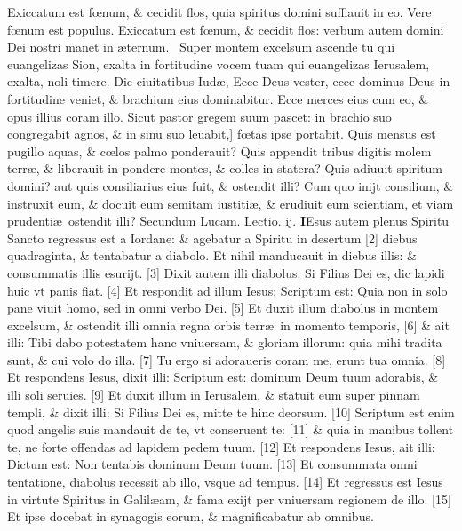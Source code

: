 \documentclass[a5paper,10pt]{book}
\def\ae{æ}
\def\oe{œ}
\begin{document}
\begin{multicols*}{2}
Exiccatum est f\oe num, \& cecidit flos, quia spiritus domini sufflauit in eo.
Vere f\oe num est populus. Exiccatum est f\oe num, \& cecidit flos: verbum autem domini Dei nostri manet in \ae ternum. \textdagger \ 
Super montem excelsum ascende tu qui euangelizas Sion, exalta in fortitudine vocem tuam qui euangelizas Ierusalem, exalta, noli timere.
Dic ciuitatibus Iud\ae , Ecce Deus vester, ecce dominus Deus in fortitudine veniet, \& brachium eius dominabitur.
Ecce merces eius cum eo, \& opus illius coram illo.
Sicut pastor gregem suum pascet: in brachio suo congregabit agnos, \& in sinu suo leuabit,] f\oe tas ipse portabit.
Quis mensus est pugillo aquas, \& c\oe los palmo ponderauit?
Quis appendit tribus digitis molem terr\ae , \& liberauit in pondere montes, \& colles in statera?
Quis adiuuit spiritum domini? aut quis consiliarius eius fuit, \& ostendit illi?
Cum quo inijt consilium, \& instruxit eum, \& docuit eum semitam iustiti\ae , \& erudiuit eum scientiam, et viam prudenti\ae \ ostendit illi?
\newline \color{red} Secundum Lucam. \hfill Lectio. ij. \color{black}
\vspace{-.25em}
\lettrine[lines=2]{\bfseries \color{red} I}{}Esus autem plenus Spiritu Sancto regressus est a Iordane: \& agebatur a Spiritu in desertum [2] diebus quadraginta, \& tentabatur a diabolo. Et nihil manducauit in diebus illis: \& consummatis illis esurijt. [3] Dixit autem illi diabolus: Si Filius Dei es, dic lapidi huic vt panis fiat. [4] Et respondit ad illum Iesus: Scriptum est: Quia non in solo pane viuit homo, sed in omni verbo Dei. [5] Et duxit illum diabolus in montem excelsum, \& ostendit illi omnia regna orbis terr\ae \ in momento temporis,
[6] \& ait illi: Tibi dabo potestatem hanc vniuersam, \& gloriam illorum: quia mihi tradita sunt, \& cui volo do illa. [7] Tu ergo si adoraueris coram me, erunt tua omnia. [8] Et respondens Iesus, dixit illi: Scriptum est: dominum Deum tuum adorabis, \& illi soli seruies. [9] Et duxit illum in Ierusalem, \& statuit eum super pinnam templi, \& dixit illi: Si Filius Dei es, mitte te hinc deorsum. [10] Scriptum est enim quod angelis suis mandauit de te, vt conseruent te:
[11] \& quia in manibus tollent te, ne forte offendas ad lapidem pedem tuum. [12] Et respondens Iesus, ait illi: Dictum est: Non tentabis dominum Deum tuum. [13] Et consummata omni tentatione, diabolus recessit ab illo, vsque ad tempus. [14] Et regressus est Iesus in virtute Spiritus in Galil\ae am, \& fama exijt per vniuersam regionem de illo. [15] Et ipse docebat in synagogis eorum, \& magnificabatur ab omnibus.

\end{multicols*}
\end{document}
